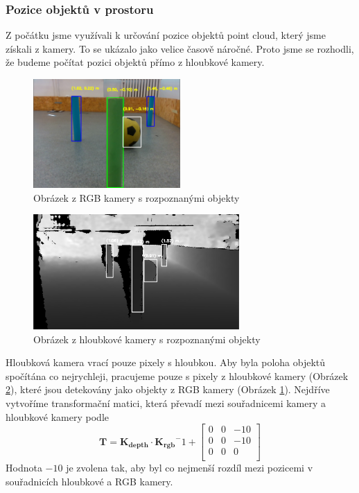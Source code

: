 \documentclass[a4paper,12pt]{article}
\begin{document}
\subsubsection{Pozice objektů v prostoru}
\label{sec:point_cloud}
Z počátku jsme využívali k určování pozice objektů point cloud, který jsme získali z kamery.
To se ukázalo jako velice časově náročné. Proto jsme se rozhodli, že budeme počítat pozici objektů přímo z hloubkové kamery.
\begin{figure}[H]
    \centering
    \includegraphics[width=0.5\textwidth]{pictures/detect.png}
    \caption{Obrázek z RGB kamery s rozpoznanými objekty}
    \label{fig:detect}
\end{figure}
\begin{figure}[H]
    \centering
    \includegraphics[width=0.7\textwidth]{pictures/depth_detect.png}
    \caption{Obrázek z hloubkové kamery s rozpoznanými objekty}
    \label{fig:depth_detect}
\end{figure}
Hloubková kamera vrací pouze pixely s hloubkou. Aby byla poloha objektů spočítána co nejrychleji, pracujeme pouze s pixely z hloubkové kamery (Obrázek \ref{fig:depth_detect}), které jsou detekovány jako objekty z RGB kamery (Obrázek \ref{fig:detect}).
Nejdříve vytvoříme transformační matici, která převadí mezi souřadnicemi kamery a hloubkové kamery podle 
\begin{equation}
    \mathbf T = \mathbf{K_{depth}} \cdot \mathbf{K_{rgb}}^-1 + \begin{bmatrix}
        0 & 0 & -10\\
        0 & 0 & -10\\
        0 & 0 & 0\\
    \end{bmatrix}
\end{equation}
Hodnota $-10$ je zvolena tak, aby byl co nejmenší rozdíl mezi pozicemi v souřadnicích hloubkové a RGB kamery.
\end{document}
